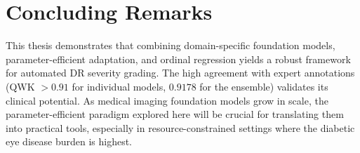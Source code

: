 \section{Concluding Remarks}
\label{sec:concluding}

This thesis demonstrates that combining domain-specific foundation models, parameter-efficient adaptation, and ordinal regression yields a robust framework for automated DR severity grading. The high agreement with expert annotations (QWK $> 0.91$ for individual models, $0.9178$ for the ensemble) validates its clinical potential. As medical imaging foundation models grow in scale, the parameter-efficient paradigm explored here will be crucial for translating them into practical tools, especially in resource-constrained settings where the diabetic eye disease burden is highest.

